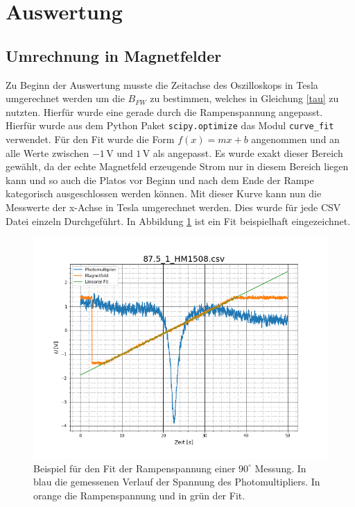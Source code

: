 \section{Auswertung}
\subsection{Umrechnung in Magnetfelder}
Zu Beginn der Auswertung musste die Zeitachse des Oszilloskops in Tesla umgerechnet werden um die $B_{FW}$ zu bestimmen, welches in Gleichung \ref{tau} zu nutzten. Hierfür wurde eine gerade durch die Rampenspannung angepasst. Hierfür wurde aus dem Python Paket \verb|scipy.optimize|\cite{SciPy_Opti} das Modul \verb|curve_fit| verwendet. Für den Fit wurde die Form $f(x)=mx+b$ angenommen und an alle Werte zwischen $-1\,$V und $1\,$V als angepasst. Es wurde exakt dieser Bereich gewählt, da der echte Magnetfeld erzeugende Strom nur in diesem Bereich liegen kann und so auch die Platos vor Beginn und nach dem Ende der Rampe kategorisch ausgeschlossen werden können. Mit dieser Kurve kann nun die Messwerte der x-Achse in Tesla umgerechnet werden. Dies wurde für jede CSV Datei einzeln Durchgeführt. In Abbildung \ref{MagnetfeldAbbildung} ist ein Fit beispielhaft eingezeichnet.\par
\begin{figure}[ht]
	\includegraphics[scale=0.5]{Bild/Magnetfeldcali.png}
	\centering
	\caption[Magnetfeld Kalibration]{Beispiel für den Fit der Rampenspannung einer $90^\circ$ Messung. In blau die gemessenen Verlauf der Spannung des Photomultipliers. In orange die Rampenspannung und in grün der Fit.}
	\label{MagnetfeldAbbildung}
\end{figure}

